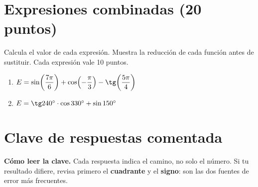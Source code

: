 \documentclass[12pt, letterpaper]{article}
\providecommand{\sen}{\sin}
\begin{document}
\section{Expresiones combinadas (20 puntos)}

\begin{cuadroinfo}
  \small
  Calcula el valor de cada expresión. Muestra la reducción de cada función
  antes de sustituir. Cada expresión vale 10 puntos.
\end{cuadroinfo}

\begin{enumerate}[leftmargin=*, label=\textbf{\arabic*.}, itemsep=1.5em]
  \item $E=\sen\!\left(\dfrac{7\pi}{6}\right)+\cos\!\left(-\dfrac{\pi}{3}\right)-\tg\!\left(\dfrac{5\pi}{4}\right)$
        \vspace{5em}

  \item $E=\tg 240^\circ\cdot\cos 330^\circ+\sen 150^\circ$
        \vspace{5em}
\end{enumerate}

\ifmwclaves
\clearpage
\section*{Clave de respuestas comentada}

\begin{cuadroinfo}
  \small
  \textbf{Cómo leer la clave.} Cada respuesta indica el camino, no solo el
  número. Si tu resultado difiere, revisa primero el \textbf{cuadrante} y el
  \textbf{signo}: son las dos fuentes de error más frecuentes.
\end{cuadroinfo}
\end{document}
